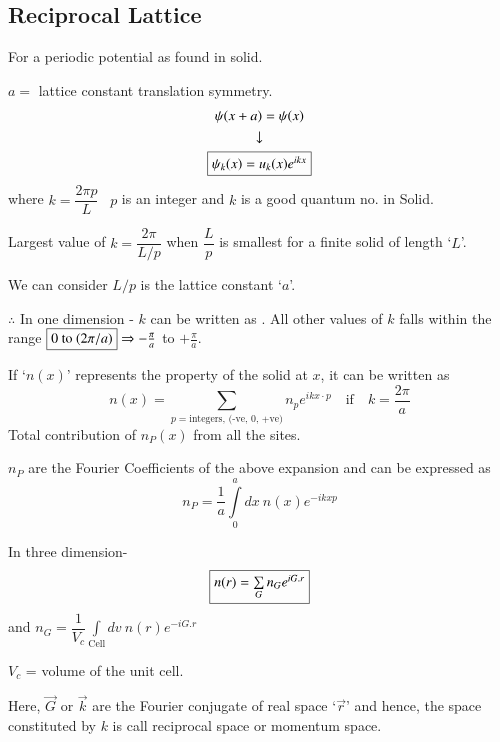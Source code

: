 \chapter[Lecture 13]{}\label{lec13}

\section*{Reciprocal Lattice}

For a periodic potential as found in solid.

$a=$ lattice constant translation symmetry.
\begin{gather*}
\psi(x+a)=\psi(x)\\
\downarrow\\
\fbox{$\psi_{k}(x)=u_{k}(x)e^{ikx}$}
\end{gather*}
where $k=\dfrac{2\pi p}{L}$ \ $p$ is an integer and $k$ is a good quantum no. in Solid.

\smallskip

Largest value of $k=\dfrac{2\pi}{L/p}$ when $\dfrac{L}{p}$ is smallest for a finite solid of length `$L$'.

\smallskip

We can consider $L/p$ is the lattice constant `$a$'.

\smallskip

$\therefore$ In one dimension - $k$ can be written as . All other values of $k$ falls within the range $\fbox{0 to $(2\pi/a)$} \Rightarrow -\frac{\pi}{a}$ to $+\frac{\pi}{a}$.

\smallskip

If `$n(x)$' represents the property of the solid at $x$, it can be written as
$$
n(x)=\sum\limits_{p=\text{integers, (-ve, 0, +ve)}}n_{p}e^{ikx\cdot p}\quad \text{if}\quad k=\dfrac{2\pi}{a}
$$
Total contribution of $n_{P}(x)$ from all the sites.

$n_{P}$ are the Fourier Coefficients of the above expansion and can be expressed as 
$$
n_{P}=\frac{1}{a}\int\limits^{a}_{0}dx \ n(x)e^{-ikxp}
$$

In three dimension-
$$
\fbox{$n(r)=\sum\limits_{G}n_{G}e^{iG.r}$}
$$
and $n_{G}=\dfrac{1}{V_{c}}\int\limits_{\text{Cell}}dv \ n(r)e^{-iG.r}$

\smallskip

$V_{c}$ = volume of the unit cell.

\smallskip

Here, $\overrightarrow{G}$ or $\overrightarrow{k}$ are the Fourier conjugate of real space `$\overrightarrow{r}$' and hence, the space constituted by $k$ is call reciprocal space or momentum space.

